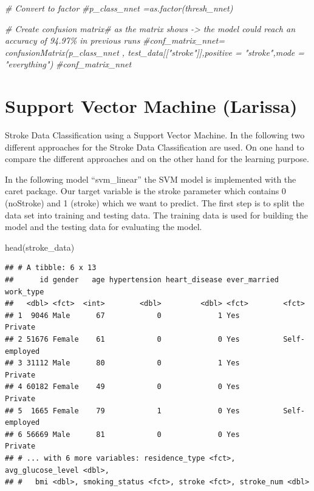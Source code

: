 \documentclass[
]{article}
\newenvironment{Shaded}{\begin{snugshade}}{\end{snugshade}}
\newcommand{\CommentTok}[1]{\textcolor[rgb]{0.56,0.35,0.01}{\textit{#1}}}
\newcommand{\FunctionTok}[1]{\textcolor[rgb]{0.00,0.00,0.00}{#1}}
\newcommand{\NormalTok}[1]{#1}
\renewcommand{\=}[1]{\stackrel{#1}{=}}
\theoremstyle{definition}
\theoremstyle{remark}
\begin{document}
\begin{Shaded}
\begin{Highlighting}[]
\CommentTok{\# Convert to factor}
\CommentTok{\#p\_class\_nnet =as.factor(thresh\_nnet)}
\end{Highlighting}
\end{Shaded}

\begin{Shaded}
\begin{Highlighting}[]
\CommentTok{\# Create confusion matrix\# as the matrix shows {-}\textgreater{} the model could reach an accuracy of 94.97\% in previous runs}
\CommentTok{\#conf\_matrix\_nnet= confusionMatrix(p\_class\_nnet , test\_data[["stroke"]],positive = "stroke",mode = "everything")}
\CommentTok{\#conf\_matrix\_nnet}
\end{Highlighting}
\end{Shaded}

\hypertarget{support-vector-machine-larissa}{%
\section{Support Vector Machine (Larissa)}\label{support-vector-machine-larissa}}

Stroke Data Classification using a Support Vector Machine. In the following two different approaches for the Stroke Data Classification are used. On one hand to compare the different approaches and on the other hand for the learning purpose.

In the following model ``svm\_linear'' the SVM model is implemented with the caret package. Our target variable is the stroke parameter which contains 0 (noStroke) and 1 (stroke) which we want to predict. The first step is to split the data set into training and testing data. The training data is used for building the model and the testing data for evaluating the model.

\begin{Shaded}
\begin{Highlighting}[]
\FunctionTok{head}\NormalTok{(stroke\_data)}
\end{Highlighting}
\end{Shaded}

\begin{verbatim}
## # A tibble: 6 x 13
##      id gender   age hypertension heart_disease ever_married work_type    
##   <dbl> <fct>  <int>        <dbl>         <dbl> <fct>        <fct>        
## 1  9046 Male      67            0             1 Yes          Private      
## 2 51676 Female    61            0             0 Yes          Self-employed
## 3 31112 Male      80            0             1 Yes          Private      
## 4 60182 Female    49            0             0 Yes          Private      
## 5  1665 Female    79            1             0 Yes          Self-employed
## 6 56669 Male      81            0             0 Yes          Private      
## # ... with 6 more variables: residence_type <fct>, avg_glucose_level <dbl>,
## #   bmi <dbl>, smoking_status <fct>, stroke <fct>, stroke_num <dbl>
\end{verbatim}
\end{document}
